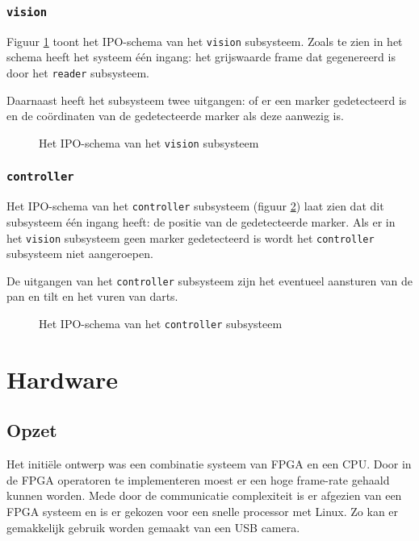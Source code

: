 \subsubsection{\texttt{vision}}

Figuur \ref{fig:ipo-vision} toont het IPO-schema van het \texttt{vision}
subsysteem. Zoals te zien in het schema heeft het systeem één ingang: het
grijswaarde frame dat gegenereerd is door het \texttt{reader} subsysteem.

Daarnaast heeft het subsysteem twee uitgangen: of er een marker gedetecteerd is
en de coördinaten van de gedetecteerde marker als deze aanwezig is.

\begin{figure}[H]
    \begin{center}
        
    \end{center}
    \caption{Het IPO-schema van het \texttt{vision} subsysteem}
    \label{fig:ipo-vision}
\end{figure}

\subsubsection{\texttt{controller}}

Het IPO-schema van het \texttt{controller} subsysteem (figuur
\ref{fig:ipo-controller}) laat zien dat dit subsysteem één ingang heeft: de
positie van de gedetecteerde marker. Als er in het \texttt{vision} subsysteem
geen marker gedetecteerd is wordt het \texttt{controller} subsysteem niet
aangeroepen.

De uitgangen van het \texttt{controller} subsysteem zijn het eventueel aansturen
van de pan en tilt en het vuren van darts.

\begin{figure}[H]
    \begin{center}
        
    \end{center}
    \caption{Het IPO-schema van het \texttt{controller} subsysteem}
    \label{fig:ipo-controller}
\end{figure}

\section{Hardware}
\label{sec:hardware}

\subsection{Opzet}
\label{sub:opzet}
Het initiële ontwerp was een combinatie systeem van FPGA en een CPU. Door in
de FPGA operatoren te implementeren moest er een hoge frame-rate gehaald kunnen
worden. Mede door de communicatie complexiteit is er afgezien van een FPGA
systeem en is er gekozen voor een snelle processor met Linux. Zo kan er gemakkelijk
gebruik worden gemaakt van een USB camera.

